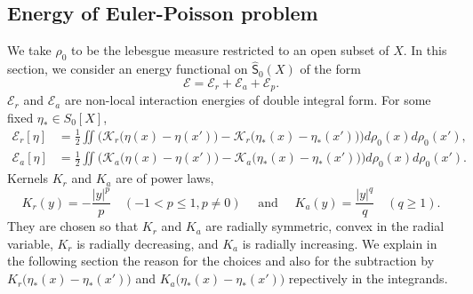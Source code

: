 \documentclass[10pt, letterpaper]{article}
\def\E{{\mathcal{E}}}
\theoremstyle{definition}
\theoremstyle{remark}
\begin{document}
\subsection{Energy of Euler-Poisson problem}
We take $\rho_0$ to be the lebesgue measure restricted to an open subset of $X$. 
In this section, we consider an energy functional on $\hat{\textsf{S}}_0(X)$ of the form
\begin{equation}
 \E = \E_{r} + \E_{a} + \E_p. \label{E}
\end{equation}
$\E_r$ and $\E_a$ are non-local interaction energies of double integral form. For some fixed $\eta_* \in S_0[X]$, 
\begin{equation} \label{Era}
    \begin{aligned}
        \E_r[\eta] &=\frac{1}{2} \iint \Big(\mathcal{K}_r\big(\eta(x)-\eta(x')\big) -  {\mathcal{K}_r\big(\eta_*(x)-\eta_*(x')\big)}\Big) d\rho_{0}(x)d\rho_0(x'), \\ 
        \E_a[\eta] &=\frac{1}{2} \iint \Big(\mathcal{K}_a\big(\eta(x)-\eta(x')\big) -  {\mathcal{K}_a\big(\eta_*(x)-\eta_*(x')\big)}\Big) d\rho_{0}(x)d\rho_0(x'). 
        \end{aligned}
\end{equation}
Kernels $K_r$ and $K_a$ are of power laws,
\begin{equation} \label{kernellaw}
    {K}_r(y) = -\frac{|y|^p}{p} \quad(-1< p \le 1, p\ne 0) \quad \text{ and }\quad {K}_a(y) = \frac{|y|^q}{q} \quad(q \ge 1).
\end{equation}
They are chosen so that ${K}_r$ and ${K}_a$ are radially symmetric, convex in the radial variable, ${K}_r$ is radially decreasing, and ${K}_a$ is radially increasing. We explain in the following section the reason for the choices and also for the subtraction by $K_r\big(\eta_*(x)-\eta_*(x')\big)$ and $K_a\big(\eta_*(x)-\eta_*(x')\big)$ repectively in the integrands. %
\end{document}
